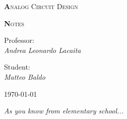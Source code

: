 \begin{titlepage}

	\centering
	{\scshape\huge\textbf Analog Circuit Design \par}
	{\scshape\huge\textbf Notes \par}	
	\vspace{13cm}
{Professor:\\ \textit{Andrea Leonardo Lacaita}}	

\vspace{0.5cm}

{Student:\\ \textit{Matteo Baldo}}


\vspace{2cm}
	\vfill
	\raggedleft
	{\today\par}

\vspace{1cm}
\raggedright
{ \it As you know from elementary school...}
	
\end{titlepage}
        \newpage
		\setcounter{page}{1}
        \null 
        \thispagestyle{empty} 
        \newpage  

\tableofcontents

